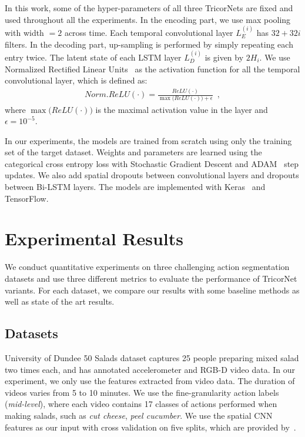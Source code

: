 \documentclass{article}
\begin{document}
In this work, some of the hyper-parameters of all three TricorNets are fixed and used throughout all the experiments. In the encoding part, we use max pooling with width $=2$ across time. Each temporal convolutional layer $L_{E}^{(i)}$ has $32+32i$ filters. In the decoding part, up-sampling is performed by simply repeating each entry twice. The latent state of each LSTM layer $L_{D}^{(i)}$ is given by $2H_i$. We use Normalized Rectified Linear Units~\cite{LeFlViCVPR2017} as the activation function for all the temporal convolutional layer, which is defined as:
%
\begin{align}
Norm. ReLU(\cdot)=\frac{ReLU(\cdot)}{\max\big(ReLU(\cdot)\big)+\epsilon}
\enspace,
\end{align}
%
where $\max\big(ReLU(\cdot)\big)$ is the maximal activation value in the layer and $\epsilon = 10^{-5}$.

In our experiments, the models are trained from scratch using only the training set of the target dataset. Weights and parameters are learned using the categorical cross entropy loss with Stochastic Gradient Descent and ADAM~\cite{adam} step updates. We also add spatial dropouts between convolutional layers and dropouts between Bi-LSTM layers. The models are implemented with Keras~\cite{keras} and TensorFlow.


\section{Experimental Results}
\label{sec:exp}

We conduct quantitative experiments on three challenging action segmentation datasets and use three different metrics to evaluate the performance of TricorNet variants. For each dataset, we compare our results with some baseline methods as well as state of the art results.

\subsection{Datasets}

University of Dundee 50 Salads \cite{50salads} dataset captures 25 people preparing mixed salad two times each, and has annotated accelerometer and RGB-D video data. In our experiment, we only use the features extracted from video data. The duration of videos varies from 5 to 10 minutes. We use the fine-granularity action labels (\textit{mid-level}), where each video contains 17 classes of actions performed when making salads, such as \textit{cut cheese}, \textit{peel cucumber}. We use the spatial CNN~\cite{scnn} features as our input with cross validation on five splits, which are provided by~\cite{LeFlViCVPR2017}.
\end{document}
